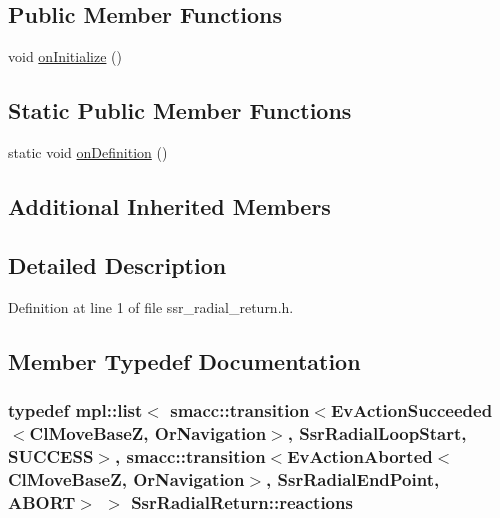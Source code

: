 \subsection*{Public Member Functions}
\begin{DoxyCompactItemize}
\item 
void \hyperlink{structSsrRadialReturn_a713e3a0722102ad2c4b030aeceefe823}{on\+Initialize} ()
\end{DoxyCompactItemize}
\subsection*{Static Public Member Functions}
\begin{DoxyCompactItemize}
\item 
static void \hyperlink{structSsrRadialReturn_a3baaac05dff1106adbacbf57edf0f162}{on\+Definition} ()
\end{DoxyCompactItemize}
\subsection*{Additional Inherited Members}


\subsection{Detailed Description}


Definition at line 1 of file ssr\+\_\+radial\+\_\+return.\+h.



\subsection{Member Typedef Documentation}
\subsubsection[{\texorpdfstring{reactions}{reactions}}]{\setlength{\rightskip}{0pt plus 5cm}typedef mpl\+::list$<$ {\bf smacc\+::transition}$<$Ev\+Action\+Succeeded$<$Cl\+Move\+BaseZ, Or\+Navigation$>$, {\bf Ssr\+Radial\+Loop\+Start}, {\bf S\+U\+C\+C\+E\+SS}$>$, {\bf smacc\+::transition}$<$Ev\+Action\+Aborted$<$Cl\+Move\+BaseZ, Or\+Navigation$>$, {\bf Ssr\+Radial\+End\+Point}, {\bf A\+B\+O\+RT}$>$ $>$ {\bf Ssr\+Radial\+Return\+::reactions}}\hypertarget{structSsrRadialReturn_a927ba4a246b63494beb537c5e300ef53}{}\label{structSsrRadialReturn_a927ba4a246b63494beb537c5e300ef53}


